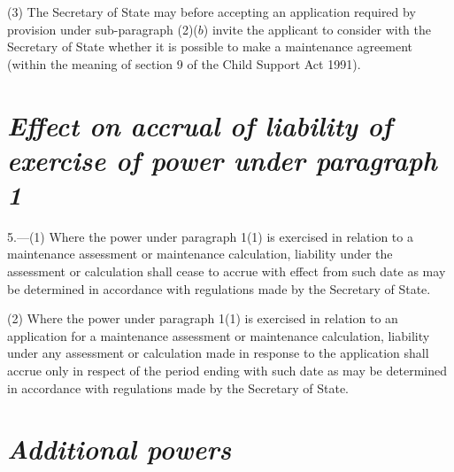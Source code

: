 \documentclass[12pt,a4paper]{article}
\begin{document}
(3) The 
Secretary of State  %
may before accepting an application required by provision under sub-paragraph (2)($b$) invite the applicant to consider with the 
Secretary of State  %
whether it is possible to make a maintenance agreement (within the meaning of section 9 of the Child Support Act 1991).



\section*{\itshape Effect on accrual of liability of exercise of power under paragraph 1}

5.---(1) Where the power under paragraph 1(1) is exercised in relation to a maintenance assessment or maintenance calculation, liability under the assessment or calculation shall cease to accrue with effect from such date as may be determined in accordance with regulations made by the Secretary of State.

(2) Where the power under paragraph 1(1) is exercised in relation to an application for a maintenance assessment or maintenance calculation, liability under any assessment or calculation made in response to the application shall accrue only in respect of the period ending with such date as may be determined in accordance with regulations made by the Secretary of State.


\section*{\itshape Additional powers}
\end{document}
